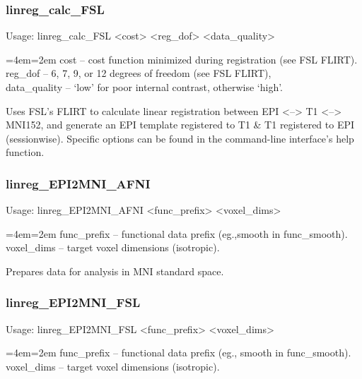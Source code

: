 \documentclass[final,titlepage,letterpaper,oneside,12pt]{article}
\renewcommand{\texttt}[2][BrickRed]{\textcolor{#1}{\ttfamily #2}}%
\newenvironment{blockquote}{%
  \par%
  \medskip
  \leftskip=4em\rightskip=2em%
  \noindent\ignorespaces}{%
  \par\medskip}
\begin{document}
\subsubsection{linreg\_calc\_FSL}
Usage: \texttt{linreg\_calc\_FSL <cost> <reg\_dof> <data\_quality>}

\begin{blockquote}
cost -- cost function minimized during registration (see FSL FLIRT). \\
reg\_dof -- 6, 7, 9, or 12 degrees of freedom (see FSL FLIRT), \\
data\_quality -- `low' for poor internal contrast, otherwise `high'. \
\end{blockquote}

\noindent Uses FSL's FLIRT to calculate linear registration between EPI <--> T1 <--> MNI152, and generate an EPI template registered to T1 \& T1 registered to EPI (sessionwise). Specific options can be found in the command-line interface's help function.

\subsubsection{linreg\_EPI2MNI\_AFNI}
Usage: \texttt{linreg\_EPI2MNI\_AFNI <func\_prefix> <voxel\_dims>}

\begin{blockquote}
func\_prefix -- functional data prefix (eg.,smooth in func\_smooth). \\
voxel\_dims -- target voxel dimensions (isotropic). \
\end{blockquote}

\noindent Prepares data for analysis in MNI standard space.

\subsubsection{linreg\_EPI2MNI\_FSL}
Usage: \texttt{linreg\_EPI2MNI\_FSL <func\_prefix> <voxel\_dims>}

\begin{blockquote}
func\_prefix -- functional data prefix (eg., smooth in func\_smooth). \\
voxel\_dims -- target voxel dimensions (isotropic). \
\end{blockquote}
\end{document}
